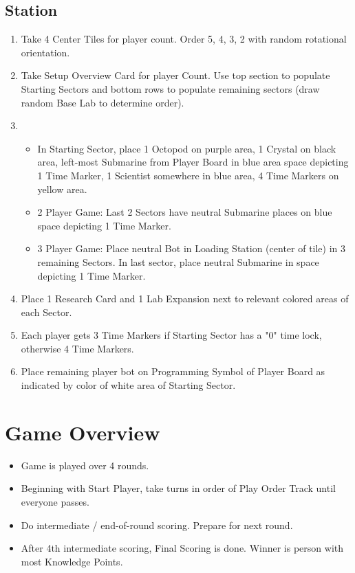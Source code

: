 \documentclass[12pt]{article}
\newenvironment{enumerateCustom}
{\begin{enumerate}
  \setlength{\itemsep}{1pt}
  \setlength{\parskip}{0pt}
  \setlength{\parsep}{0pt}}
{\end{enumerate}}
\newenvironment{itemizeCustom}
{\begin{itemize}
  \setlength{\itemsep}{1pt}
  \setlength{\parskip}{0pt}
  \setlength{\parsep}{0pt}}
{\end{itemize}}
\begin{document}
\begin{multicols*}{2}
\subsection*{Station}
\begin{enumerateCustom}
    \item Take 4 Center Tiles for player count. Order 5, 4, 3, 2 with random rotational orientation.
    \item Take Setup Overview Card for player Count. Use top section to populate Starting Sectors and bottom rows to populate remaining sectors (draw random Base Lab to determine order).
    \item 
        \begin{itemizeCustom}
            \item In Starting Sector, place 1 Octopod on purple area, 1 Crystal on black area, left-most Submarine from Player Board in blue area space depicting 1 Time Marker, 1 Scientist somewhere in blue area, 4 Time Markers on yellow area.
            \item 2 Player Game: Last 2 Sectors have neutral Submarine places on blue space depicting 1 Time Marker.
            \item 3 Player Game: Place neutral Bot in Loading Station (center of tile) in 3 remaining Sectors. In last sector, place neutral Submarine in space depicting 1 Time Marker.
        \end{itemizeCustom}
    \item Place 1 Research Card and 1 Lab Expansion next to relevant colored areas of each Sector.
    \item Each player gets 3 Time Markers if Starting Sector has a "0" time lock, otherwise 4 Time Markers.
    \item Place remaining player bot on Programming Symbol of Player Board as indicated by color of white area of Starting Sector.
\end{enumerateCustom}

\section*{Game Overview}
\begin{itemizeCustom}
    \item Game is played over 4 rounds.
    \item Beginning with Start Player, take turns in order of Play Order Track until everyone passes.
    \item Do intermediate / end-of-round scoring. Prepare for next round.
    \item After 4th intermediate scoring, Final Scoring is done. Winner is person with most Knowledge Points.
\end{itemizeCustom}


\end{multicols*}
\end{document}
